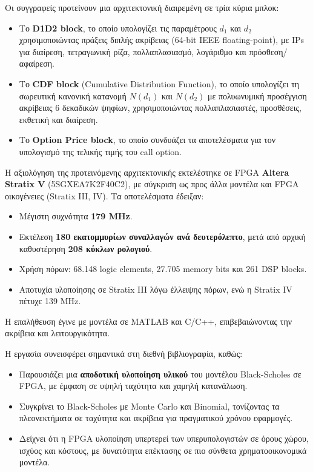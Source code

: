 Οι συγγραφείς προτείνουν μια αρχιτεκτονική διαιρεμένη σε τρία κύρια μπλοκ:
\begin{itemize}
  \item Το \textbf{D1D2 block}, το οποίο υπολογίζει τις παραμέτρους $d_1$ και $d_2$ χρησιμοποιώντας πράξεις διπλής ακρίβειας (64-bit IEEE floating-point), με IPs για διαίρεση, τετραγωνική ρίζα, πολλαπλασιασμό, λογάριθμο και πρόσθεση/αφαίρεση.
  \item Το \textbf{CDF block} (Cumulative Distribution Function), το οποίο υπολογίζει τη σωρευτική κανονική κατανομή $N(d_1)$ και $N(d_2)$ με πολυωνυμική προσέγγιση ακρίβειας 6 δεκαδικών ψηφίων, χρησιμοποιώντας πολλαπλασιαστές, προσθέσεις, εκθετική και διαίρεση.
  \item Το \textbf{Option Price block}, το οποίο συνδυάζει τα αποτελέσματα για τον υπολογισμό της τελικής τιμής του call option.
\end{itemize}

Η αξιολόγηση της προτεινόμενης αρχιτεκτονικής εκτελέστηκε σε FPGA \textbf{Altera Stratix V} (5SGXEA7K2F40C2), με σύγκριση ως προς άλλα μοντέλα και FPGA οικογένειες (Stratix III, IV).
Τα αποτελέσματα έδειξαν:
\begin{itemize}
  \item Μέγιστη συχνότητα \textbf{179 MHz}.
  \item Εκτέλεση \textbf{180 εκατομμυρίων συναλλαγών ανά δευτερόλεπτο}, μετά από αρχική καθυστέρηση \textbf{208 κύκλων ρολογιού}.
  \item Χρήση πόρων: 68.148 logic elements, 27.705 memory bits και 261 DSP blocks.
  \item Αποτυχία υλοποίησης σε Stratix III λόγω έλλειψης πόρων, ενώ η Stratix IV πέτυχε 139 MHz.
\end{itemize}
Η επαλήθευση έγινε με μοντέλα σε MATLAB και C/C++, επιβεβαιώνοντας την ακρίβεια και λειτουργικότητα.

Η εργασία συνεισφέρει σημαντικά στη διεθνή βιβλιογραφία, καθώς:
\begin{itemize}
  \item Παρουσιάζει μια \textbf{αποδοτική υλοποίηση υλικού} του μοντέλου Black-Scholes σε FPGA, με έμφαση σε υψηλή ταχύτητα και χαμηλή κατανάλωση.
  \item Συγκρίνει το Black-Scholes με Monte Carlo και Binomial, τονίζοντας τα πλεονεκτήματα σε ταχύτητα και ακρίβεια για πραγματικού χρόνου εφαρμογές.
  \item Δείχνει ότι η FPGA υλοποίηση υπερτερεί των υπερυπολογιστών σε όρους χώρου, ισχύος και κόστους, με δυνατότητα επέκτασης σε πιο σύνθετα χρηματοοικονομικά μοντέλα.
\end{itemize}

